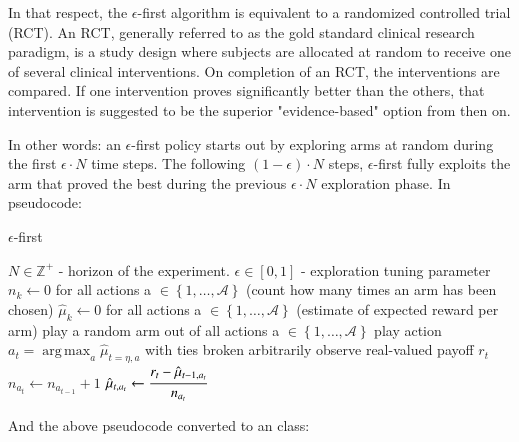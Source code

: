 \documentclass{jss}
\DeclareMathOperator*{\argmax}{arg\,max}
\begin{document}
In that respect, the $\epsilon$-first algorithm is equivalent to a randomized controlled trial (RCT). An RCT, generally referred to as the gold standard clinical research paradigm, is a study design where subjects are allocated at random to receive one of several clinical interventions. On completion of an RCT, the interventions are compared. If one intervention proves significantly better than the others, that intervention is suggested to be the superior "evidence-based" option from then on.

In other words: an $\epsilon$-first policy starts out by exploring arms at random during the first $\epsilon \cdot N$ time steps. The following $(1-\epsilon) \cdot N$ steps, $\epsilon$-first fully exploits the arm that proved the best during the previous $\epsilon \cdot N$ exploration phase. In pseudocode:

\begin{algorithm}[H]
\caption{$\epsilon$-first}
\label{Alg:EpsilonFirst}
\begin{algorithmic}
\REQUIRE \(   N \in \mathbb{Z}^{+} \) - horizon of the experiment.
\REQUIRE \(   \epsilon  \in \left[ 0,1 \right] \) - exploration tuning parameter
\STATE \( n_{k} \leftarrow 0 \) for all actions a \(  \in \left\{ 1, \dots, \mathcal{A} \right\} \)  (count how many times an arm has been chosen)
\STATE \( \hat{\mu}_{k} \leftarrow 0 \) for all actions a  \(   \in \left\{ 1, \dots, \mathcal{A} \right\} \)  (estimate of expected reward per arm)
	       \STATE play a random arm out of all actions a \(   \in \left\{ 1, \dots, \mathcal{A} \right\} \)
	\ELSE
	        \STATE play action \(a_t = \argmax_a  \hat{\mu}_{t=\eta,a}  \) with ties broken arbitrarily
	\ENDIF
	\STATE observe real-valued payoff $r_t$
	\STATE \( n_{a_{t}} \leftarrow n_{a_{t-1}} + 1  \) 
  \STATE \( \hat{\mu}_{t,a_{t}} \leftarrow   \cfrac{r_t - \hat{\mu}_{t-1,a_{t}} }{n_{a_{t}}}   \) 
\ENDFOR
\end{algorithmic}
\end{algorithm}

And the above pseudocode converted to an  class:
\end{document}
